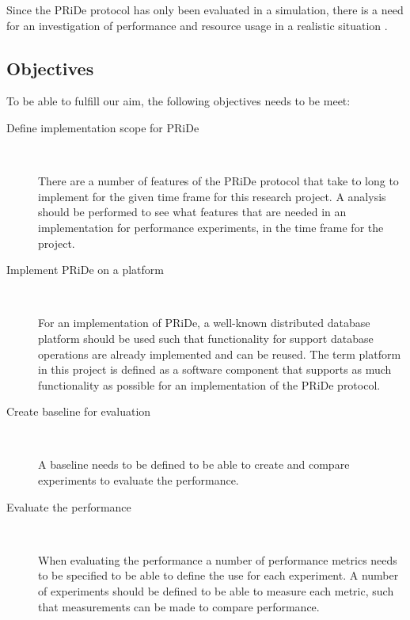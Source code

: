Since the PRiDe protocol has only been evaluated in a simulation, there is a need for an investigation of performance and resource usage in a realistic situation \cite[]{Syber2007}.

\subsection{Objectives} 
\label{subsec:objectives}

To be able to fulfill our aim, the following objectives needs to be meet:  

\begin{description}

	\item[Define implementation scope for PRiDe] \

	There are a number of features of the PRiDe protocol that take to long to implement for the given time frame for this research project. A analysis should be performed to see what features that are needed in an implementation for performance experiments, in the time frame for the project.

	\item[Implement PRiDe on a platform] \

	For an implementation of PRiDe, a well-known distributed database platform should be used such that functionality for support database operations are already implemented and can be reused. The term platform in this project is defined as a software component that supports as much functionality as possible for an implementation of the PRiDe protocol. 

	\item[Create baseline for evaluation] \

	A baseline needs to be defined to be able to create and compare experiments to evaluate the performance.  


	\item[Evaluate the performance] \

	When evaluating the performance a number of performance metrics needs to be specified to be able to define the use for each experiment. A number of experiments should be defined to be able to measure each metric, such that measurements can be made to compare performance.  


\end{description}
